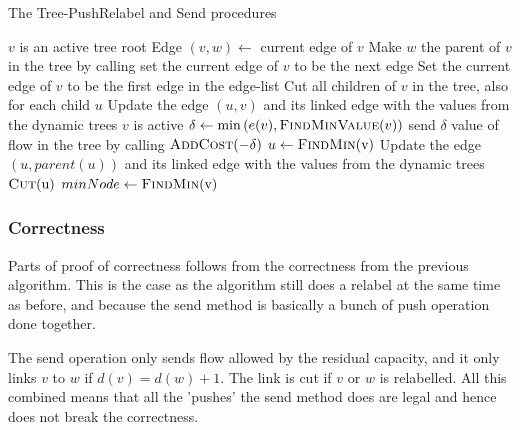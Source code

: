 \begin{algorithm}
\caption{The Tree-PushRelabel and Send procedures}\label{GT88TreePushRelabelSend}
\begin{algorithmic}[1]
\Statex
\Require $v$ is an active tree root
	\State Edge $(v,w) \gets$ current edge of $v$
			\State Make $w$ the parent of $v$ in the tree by calling 
			\State {}
			\State {}
		\Else
			\State {}
			\State {}
		\EndIf
	\Else
			\State set the current edge of $v$ to be the next edge
		\Else
			\State Set the current edge of $v$ to be the first edge in the edge-list
			\State Cut all children of $v$ in the tree, also for each child $u$ Update the edge $(u,v)$ and its linked edge with the values from the dynamic trees
			\State {}
		\EndIf
	\EndIf
\EndProcedure
\Statex
\Require $v$ is active
		\State $\delta \gets \min{(e(v), \Call{FindMinValue}{v}})$
		\State send $\delta$ value of flow  in the tree by calling $\Call{AddCost}{-\delta}$
			\State $u \gets \Call{FindMin}{$v$} $
			\State Update the edge $(u,parent(u))$ and its linked edge with the values from the dynamic trees
			\State $\Call{Cut}{$u$} $
		\EndWhile
	\EndWhile
\EndProcedure
\Statex
{}
	\State $minNode \gets \Call{FindMin}{$v$}$
	\State \Return {}
\EndFunction
\end{algorithmic}
\end{algorithm}

\subsubsection{Correctness}
Parts of proof of correctness follows from the correctness from the previous algorithm. This is the case as the algorithm still does a relabel at
the same time as before, and because the send method is basically a bunch of push operation done together.

The send operation only sends flow allowed by the residual capacity, and it only links $v$ to $w$ if $d(v) = d(w) + 1$. The link is cut if
$v$ or $w$ is relabelled. All this combined means that all the 'pushes' the send method does are legal and hence does not break the correctness.

